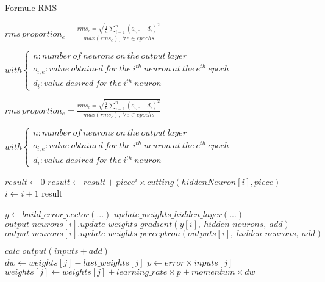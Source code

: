 
Formule RMS

$ rms\ proportion_{e} = \frac{ rms_{e} = \sqrt{ \frac{1}{n} \sum \limits_{i=1}^{n} ( o_{i,e} - d_{i} )^2 }}{max(rms_{e}),\ \forall e \in epochs } $

$ with \left\lbrace \begin{array}{lll} n : number\ of\ neurons\ on\ the\ output\ layer\\o_{i,e} : value\ obtained\ for\ the\ i^{th}\ neuron\ at\ the\ e^{th}\ epoch\\d_{i} : value\ desired \ for\ the\ i^{th}\ neuron\end{array} \right.$
         
$ rms\ proportion_{e} = \frac{ rms_{e} = \sqrt{ \frac{1}{n} \sum \limits_{i=1}^{n} ( o_{i,e} - d_{i} )^2 }}{max(rms_{e}),\ \forall e \in epochs } $

$ with \left\lbrace \begin{array}{lll} n : number\ of\ neurons\ on\ the\ output\ layer\\o_{i,e} : value\ obtained\ for\ the\ i^{th}\ neuron\ at\ the\ e^{th}\ epoch\\d_{i} : value\ desired \ for\ the\ i^{th}\ neuron\end{array} \right.$
         





\begin{algorithmic}

\State $result \gets 0$
\State $result \gets result + piece^{i} \times cutting(hiddenNeuron[i], piece) $
\State $i \gets i + 1$
\EndFor
\State \Return result
\EndFunction

\end{algorithmic}


\begin{algorithmic}

\State $y \gets build\_error\_vector(...)$
\State $update\_weights\_hidden\_layer( ...)$
\\
\State $output\_neurons[i].update\_weights\_gradient(y[i],\ hidden\_neurons,\ add)$
\State $output\_neurons[i].update\_weights\_perceptron(outputs[i],\ hidden\_neurons,\ add)$
\EndFor
\EndFunction

\end{algorithmic}


\begin{algorithmic}

\State $calc\_output(inputs + add)$
\\
\State $dw \gets weights[j] - last\_weights[j]$
\State $p \gets error \times inputs[j]$
\State $weights[j] \gets weights[j] + learning\_rate \times p + momentum \times dw$
\EndFor
\EndFunction

\end{algorithmic}




